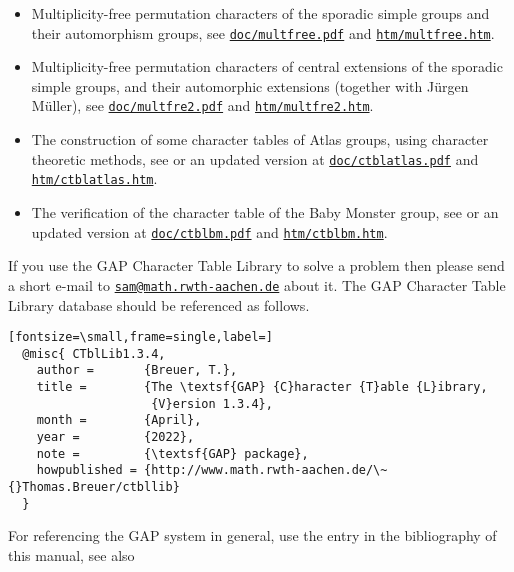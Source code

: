 \documentclass[a4paper,11pt]{report}
\begin{document}
{\begin{itemize}
\item  Multiplicity-free permutation characters of the sporadic simple groups and
their automorphism groups, see \href{http://www.math.rwth-aachen.de/~Thomas.Breuer/ctbllib/doc/multfree.pdf} {\texttt{doc/multfree.pdf}} and \href{http://www.math.rwth-aachen.de/~Thomas.Breuer/ctbllib/htm/multfree.htm} {\texttt{htm/multfree.htm}}. 
\item  Multiplicity-free permutation characters of central extensions of the sporadic
simple groups, and their automorphic extensions (together with J{\"u}rgen
M{\"u}ller), see \href{http://www.math.rwth-aachen.de/~Thomas.Breuer/ctbllib/doc/multfre2.pdf} {\texttt{doc/multfre2.pdf}} and \href{http://www.math.rwth-aachen.de/~Thomas.Breuer/ctbllib/htm/multfre2.htm} {\texttt{htm/multfre2.htm}}. 
\item  The construction of some character tables of \textsf{Atlas} groups, using character theoretic methods, see \cite{AtlasVerifyLargeArxiv} or an updated version at \href{http://www.math.rwth-aachen.de/~Thomas.Breuer/ctbllib/doc/ctblatlas.pdf} {\texttt{doc/ctblatlas.pdf}} and \href{http://www.math.rwth-aachen.de/~Thomas.Breuer/ctbllib/htm/ctblatlas.htm} {\texttt{htm/ctblatlas.htm}}. 
\item  The verification of the character table of the Baby Monster group, see \cite{BMverify} or an updated version at \href{http://www.math.rwth-aachen.de/~Thomas.Breuer/ctbllib/doc/ctblbm.pdf} {\texttt{doc/ctblbm.pdf}} and \href{http://www.math.rwth-aachen.de/~Thomas.Breuer/ctbllib/htm/ctblbm.htm} {\texttt{htm/ctblbm.htm}}. 
\end{itemize}
 

 If you use the \textsf{GAP} Character Table Library to solve a problem then please send a short e-mail to \href{mailto://sam@math.rwth-aachen.de} {\texttt{sam@math.rwth-aachen.de}} about it. The \textsf{GAP} Character Table Library database should be referenced as follows. 
\begin{Verbatim}[fontsize=\small,frame=single,label=]
  @misc{ CTblLib1.3.4,
    author =       {Breuer, T.},
    title =        {The \textsf{GAP} {C}haracter {T}able {L}ibrary,
                    {V}ersion 1.3.4},
    month =        {April},
    year =         {2022},
    note =         {\textsf{GAP} package},
    howpublished = {http://www.math.rwth-aachen.de/\~{}Thomas.Breuer/ctbllib}
  }
\end{Verbatim}
 

 For referencing the \textsf{GAP} system in general, use the entry{\nobreakspace}\cite{GAP} in the bibliography of this manual, see also 

}
\end{document}
